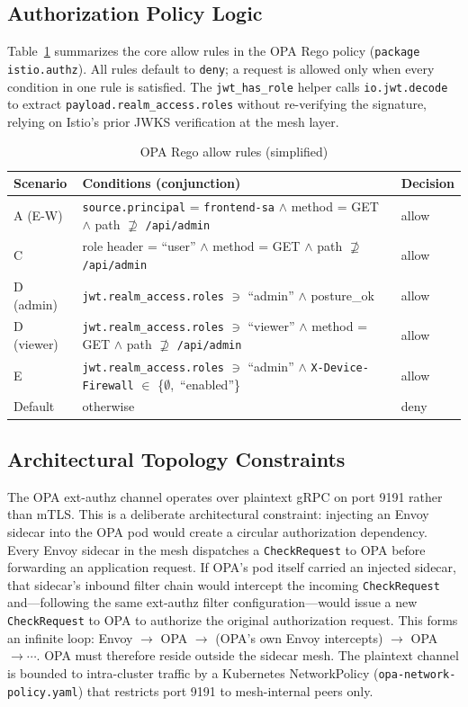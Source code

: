 \documentclass[conference]{IEEEtran}
\begin{document}
\subsection{Authorization Policy Logic}
Table~\ref{tab:rego} summarizes the core allow rules in the OPA Rego policy
(\texttt{package istio.authz}). All rules default to \texttt{deny}; a request
is allowed only when every condition in one rule is satisfied. The
\texttt{jwt\_has\_role} helper calls \texttt{io.jwt.decode} to extract
\texttt{payload.realm\_access.roles} without re-verifying the signature,
relying on Istio's prior JWKS verification at the mesh layer.

\begin{table}[!t]
\caption{OPA Rego allow rules (simplified)}
\label{tab:rego}
\centering
\scriptsize
\begin{tabularx}{\columnwidth}{l >{\raggedright\arraybackslash}X l}
\toprule
Scenario & Conditions (conjunction) & Decision \\
\midrule
A (E-W) & \texttt{source.principal} = \texttt{frontend-sa} $\wedge$ method = GET $\wedge$ path $\not\supseteq$ \texttt{/api/admin} & allow \\
C & role header = ``user'' $\wedge$ method = GET $\wedge$ path $\not\supseteq$ \texttt{/api/admin} & allow \\
D (admin) & \texttt{jwt.realm\_access.roles} $\ni$ ``admin'' $\wedge$ posture\_ok & allow \\
D (viewer) & \texttt{jwt.realm\_access.roles} $\ni$ ``viewer'' $\wedge$ method = GET $\wedge$ path $\not\supseteq$ \texttt{/api/admin} & allow \\
E & \texttt{jwt.realm\_access.roles} $\ni$ ``admin'' $\wedge$ \texttt{X-Device-Firewall} $\in$ \{$\emptyset$,\ ``enabled''\} & allow \\
Default & otherwise & deny \\
\bottomrule
\end{tabularx}
\end{table}

\subsection{Architectural Topology Constraints}
\label{sec:topo}
The OPA ext-authz channel operates over plaintext gRPC on port 9191 rather than mTLS.
This is a deliberate architectural constraint: injecting an Envoy sidecar into the OPA pod
would create a circular authorization dependency. Every Envoy sidecar in the mesh dispatches
a \texttt{CheckRequest} to OPA before forwarding an application request. If OPA's pod itself
carried an injected sidecar, that sidecar's inbound filter chain would intercept the incoming
\texttt{CheckRequest} and---following the same ext-authz filter configuration---would issue a
new \texttt{CheckRequest} to OPA to authorize the original authorization request. This forms
an infinite loop: Envoy $\to$ OPA $\to$ (OPA's own Envoy intercepts) $\to$ OPA $\to \cdots$.
OPA must therefore reside outside the sidecar mesh. The plaintext channel is bounded to
intra-cluster traffic by a Kubernetes NetworkPolicy (\texttt{opa-network-policy.yaml}) that
restricts port 9191 to mesh-internal peers only.
\end{document}
